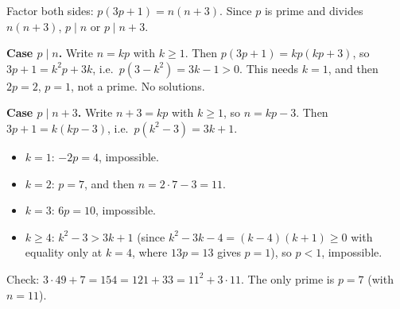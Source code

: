 Factor both sides: $p(3p+1)=n(n+3)$. Since $p$ is prime and divides $n(n+3)$, $p\mid n$ or $p\mid n+3$.

\textbf{Case $p\mid n$.} Write $n=kp$ with $k\ge1$. Then $p(3p+1)=kp(kp+3)$, so $3p+1=k^2p+3k$, i.e.\ $p\left(3-k^2\right)=3k-1>0$. This needs $k=1$, and then $2p=2$, $p=1$, not a prime. No solutions.

\textbf{Case $p\mid n+3$.} Write $n+3=kp$ with $k\ge1$, so $n=kp-3$. Then $3p+1=k(kp-3)$, i.e.\ $p\left(k^2-3\right)=3k+1$.
\begin{itemize}
\item $k=1$: $-2p=4$, impossible.
\item $k=2$: $p=7$, and then $n=2\cdot7-3=11$.
\item $k=3$: $6p=10$, impossible.
\item $k\ge4$: $k^2-3>3k+1$ (since $k^2-3k-4=(k-4)(k+1)\ge0$ with equality only at $k=4$, where $13p=13$ gives $p=1$), so $p<1$, impossible.
\end{itemize}

Check: $3\cdot49+7=154=121+33=11^2+3\cdot11$. The only prime is $\boxed{p=7}$ (with $n=11$).
